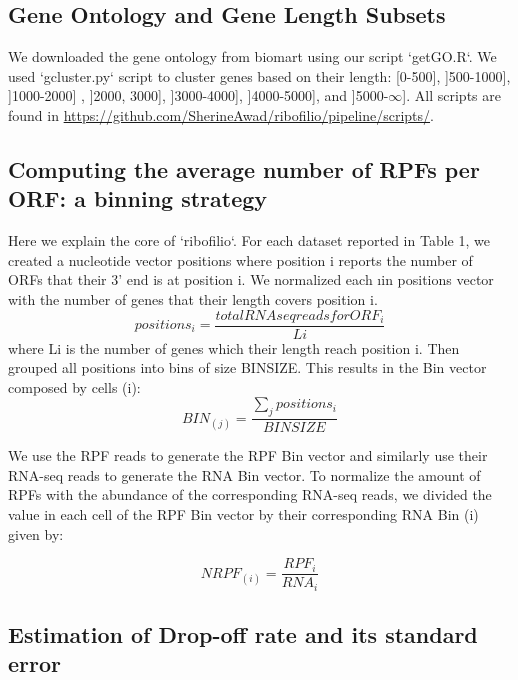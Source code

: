 \documentclass[a4,center,fleqn]{NAR}
\begin{document}
\subsection{Gene Ontology and Gene Length Subsets} \label{GOGL}

We downloaded the gene ontology from biomart using our script `getGO.R`. We used `gcluster.py` script to cluster genes based on their length: [0-500], ]500-1000], ]1000-2000] , ]2000, 3000], ]3000-4000], ]4000-5000], and ]5000-$\infty$]. All scripts are found in \url{https://github.com/SherineAwad/ribofilio/pipeline/scripts/}.


\subsection{Computing the average number of RPFs per ORF: a binning strategy}
Here we explain the core of ‘ribofilio‘.
For each dataset reported in Table 1, we created a nucleotide
vector positions where position i reports the number of ORFs that their 3’ end is at position i. We normalized each ıin positions vector with the number of genes that their length covers position i.
\begin{equation*} \label{eq:1}
positions_{i}= \frac{total RNAseq reads for ORF_{i}}{Li}
\end{equation*}
where Li is the number of genes which their length reach position i.
Then grouped all positions into bins of size BINSIZE. This results in the Bin vector composed by cells (i):
\begin{equation*} \label{eq:2}
BIN_{(j)} = \frac{\sum_{j}{positions_{i}}} {BINSIZE}
\end{equation*}

We use the RPF reads to generate the RPF Bin vector and similarly use their RNA-seq reads to generate the RNA Bin vector. To normalize the amount of RPFs with the abundance of the corresponding RNA-seq reads, we divided the value in each cell of the RPF Bin vector by their corresponding RNA Bin (i) given by:

\begin{equation*} \label{eq:3}
    NRPF_{(i)} = \frac{RPF_{i}}{RNA_{i}}
\end{equation*}



\subsection{Estimation of Drop-off rate and its standard error}
\end{document}

